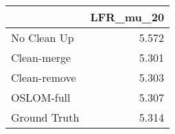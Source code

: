 \begin{tabular}{lr}
\toprule
{} & LFR_mu_20 \\
\midrule
No Clean Up  &     5.572 \\
Clean-merge  &     5.301 \\
Clean-remove &     5.303 \\
OSLOM-full   &     5.307 \\
Ground Truth &     5.314 \\
\bottomrule
\end{tabular}
